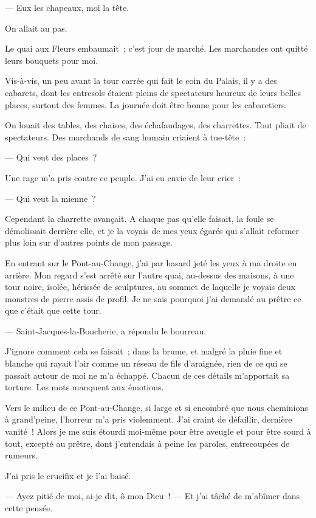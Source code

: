 \documentclass[french,twoside]{book} %
\begin{document}
 — Eux les chapeaux, moi la tête.\par
On allait au pas.\par
Le quai aux Fleurs embaumait ; c’est jour de marché. Les marchandes ont quitté leurs bouquets pour moi.\par
Vis-à-vis, un peu avant la tour carrée qui fait le coin du Palais, il y a des cabarets, dont les entresols étaient pleins de spectateurs heureux de leurs belles places, surtout des femmes. La journée doit être bonne pour les cabaretiers.\par
On louait des tables, des chaises, des échafaudages, des charrettes. Tout pliait de spectateurs. Des marchands de sang humain criaient à tue-tête :\par
— Qui veut des places ?\par
Une rage m’a pris contre ce peuple. J’ai eu envie de leur crier :\par
— Qui veut la mienne ?\par
Cependant la charrette avançait. A chaque pas qu’elle faisait, la foule se démolissait derrière elle, et je la voyais de mes yeux égarés qui s’allait reformer plus loin sur d’autres points de mon passage.\par
En entrant sur le Pont-au-Change, j’ai par hasard jeté les yeux à ma droite en arrière. Mon regard s’est arrêté sur l’autre quai, au-dessus des maisons, à une tour noire, isolée, hérissée de sculptures, au sommet de laquelle je voyais deux monstres de pierre assis de profil. Je ne sais pourquoi j’ai demandé au prêtre ce que c’était que cette tour.\par
— Saint-Jacques-la-Boucherie, a répondu le bourreau.\par
 J’ignore comment cela se faisait ; dans la brume, et malgré la pluie fine et blanche qui rayait l’air comme un réseau de fils d’araignée, rien de ce qui se passait autour de moi ne m’a échappé. Chacun de ces détails m’apportait sa torture. Les mots manquent aux émotions.\par
Vers le milieu de ce Pont-au-Change, si large et si encombré que nous cheminions à grand’peine, l’horreur m’a pris violemment. J’ai craint de défaillir, dernière vanité ! Alors je me suis étourdi moi-même pour être aveugle et pour être sourd à tout, excepté au prêtre, dont j’entendais à peine les paroles, entrecoupées de rumeurs.\par
J’ai pris le crucifix et je l’ai baisé.\par
— Ayez pitié de moi, ai-je dit, ô mon Dieu ! — Et j’ai tâché de m’abîmer dans cette pensée.\par
\end{document}
